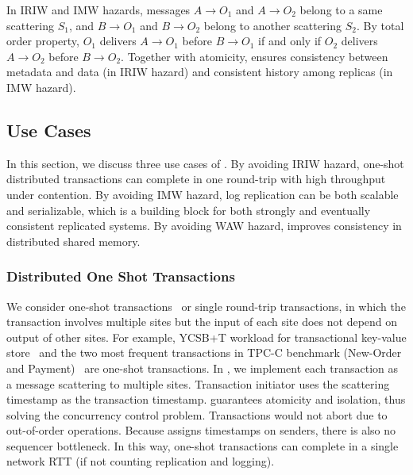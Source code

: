 In IRIW and IMW hazards, messages $A \rightarrow O_1$ and $A \rightarrow O_2$ belong to a same scattering $S_1$, and $B \rightarrow O_1$ and $B \rightarrow O_2$ belong to another scattering $S_2$.
By total order property, $O_1$ delivers $A \rightarrow O_1$ before $B \rightarrow O_1$ if and only if $O_2$ delivers $A \rightarrow O_2$ before $B \rightarrow O_2$.
Together with atomicity, \sys ensures consistency between metadata and data (in IRIW hazard) and consistent history among replicas (in IMW hazard).


\subsection{Use Cases}
\label{subsec:application-scenarios}

In this section, we discuss three use cases of \sys.
By avoiding IRIW hazard, one-shot distributed transactions can complete in one round-trip with high throughput under contention.
By avoiding IMW hazard, log replication can be both scalable and serializable, which is a building block for both strongly and eventually consistent replicated systems.
By avoiding WAW hazard, \sys improves consistency in distributed shared memory.

\subsubsection{Distributed One Shot Transactions}
\label{subsec:transactional-kvs}
We consider one-shot transactions~\cite{kallman2008h} or single round-trip transactions, in which the transaction involves multiple sites but the input of each site does not depend on output of other sites.
For example, YCSB+T workload for transactional key-value store~\cite{dey2014ycsbt} and the two most frequent transactions in TPC-C benchmark (New-Order and Payment)~\cite{tpcc} are one-shot transactions.
In \sys, we implement each transaction as a message scattering to multiple sites.
Transaction initiator uses the scattering timestamp as the transaction timestamp.
\sys guarantees atomicity and isolation, thus solving the concurrency control problem.
Transactions would not abort due to out-of-order operations.
Because \sys assigns timestamps on senders, there is also no sequencer bottleneck.
In this way, one-shot transactions can complete in a single network RTT (if not counting replication and logging).

